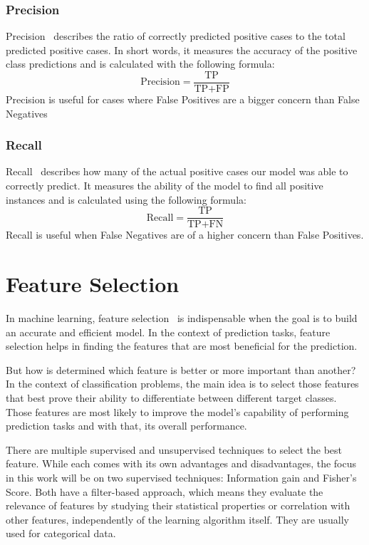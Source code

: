\subsubsection{Precision}
Precision~\cite{evaluation_metrics} describes the ratio of correctly predicted positive cases to the total predicted positive cases. In short words, it measures the accuracy of the positive class predictions and is calculated with the following formula:
\[ \text{Precision} = \frac{\text{TP}}{\text{TP} + \text{FP}} \]
Precision is useful for cases where False Positives are a bigger concern than False Negatives

\subsubsection{Recall}
Recall~\cite{evaluation_metrics} describes how many of the actual positive cases our model was able to correctly predict. It measures the ability of the model to find all positive instances and is calculated using the following formula:
\[ \text{Recall} = \frac{\text{TP}}{\text{TP} + \text{FN}} \]
Recall is useful when False Negatives are of a higher concern than False Positives.

\section{Feature Selection}
In machine learning, feature selection~\cite{feature_selection} is indispensable when the goal is to build an accurate and efficient model. In the context of prediction tasks, feature selection helps in finding the features that are most beneficial for the prediction. 

But how is determined which feature is better or more important than another? In the context of classification problems, the main idea is to select those features that best prove their ability to differentiate between different target classes. Those features are most likely to improve the model's capability of performing prediction tasks and with that, its overall performance.

There are multiple supervised and unsupervised techniques to select the best feature. While each comes with its own advantages and disadvantages, the focus in this work will be on two supervised techniques: Information gain and Fisher's Score. Both have a filter-based approach, which means they evaluate the relevance of features by studying their statistical properties or correlation with other features, independently of the learning algorithm itself. They are usually used for categorical data.


